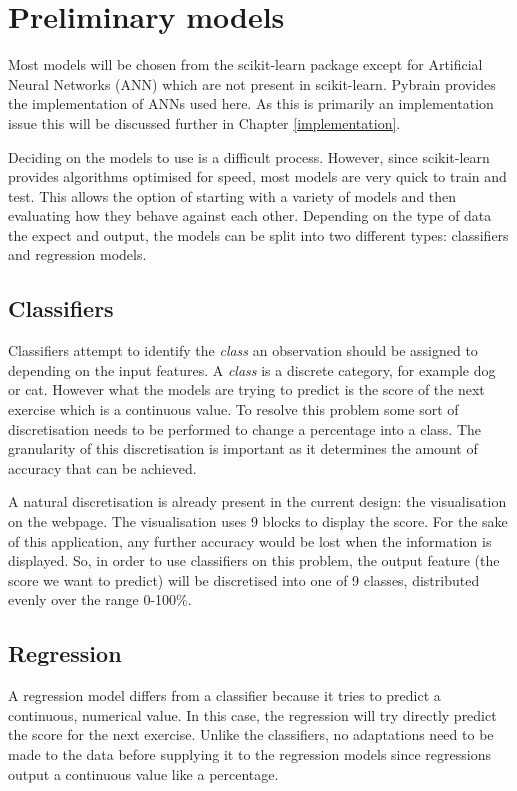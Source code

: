 \section{Preliminary models}
Most models will be chosen from the scikit-learn\cite{scikit_site} package except for Artificial Neural Networks (ANN) which are not present in scikit-learn. Pybrain provides the implementation of ANNs used here. As this is primarily an implementation issue this will be discussed further in Chapter \ref{implementation}.

Deciding on the models to use is a difficult process. However, since scikit-learn provides algorithms optimised for speed, most models are very quick to train and test. This allows the option of starting with a variety of models and then evaluating how they behave against each other. Depending on the type of data the expect and output, the models can be split into two different types: classifiers and regression models.

\subsection{Classifiers}
Classifiers attempt to identify the {\it class} an observation should be assigned to depending on the input features. A {\it class} is a discrete category, for example dog or cat. However what the models are trying to predict is the score of the next exercise which is a continuous value. To resolve this problem some sort of discretisation needs to be performed to change a percentage into a class. The granularity of this discretisation is important as it determines the amount of accuracy that can be achieved. 

A natural discretisation is already present in the current design: the visualisation on the webpage. The visualisation uses 9 blocks to display the score. For the sake of this application, any further accuracy would be lost when the information is displayed. So, in order to use classifiers on this problem, the output feature (the score we want to predict) will be discretised into one of 9 classes, distributed evenly over the range 0-100\%.

\subsection{Regression}
A regression model differs from a classifier because it tries to predict a continuous, numerical value. In this case, the regression will try directly predict the score for the next exercise.
Unlike the classifiers, no adaptations need to be made to the data before supplying it to the regression models since regressions output a continuous value like a percentage.

